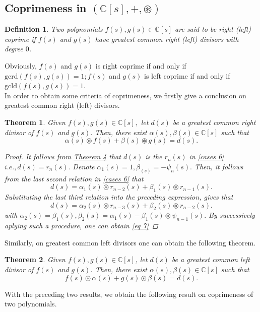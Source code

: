 \documentclass[12pt,a4paper,fleqn,twoside]{article}
\newtheorem{definition}{Definition}
\theoremstyle{plain}
\newtheorem{theorem}{Theorem}
\begin{document}
	\subsection{Coprimeness in $(\mathbb{C}[s],+,\circledast)$}
	\begin{definition}
		\normalfont
		Two polynomials $f(s),g(s)\in \mathbb{C}[s]$ are said to be right (left) coprime if $f(s)$ and $g(s)$ have greatest common right (left) divisors with degree $0$.
	\end{definition}
	Obviously, $f(s)$ and $g(s)$ is right coprime if and only if $\mathrm{gcrd}(f(s),g(s))=1; f(s)$ and $g(s)$ is left coprime if and only if $\mathrm{gcld}(f(s),g(s))=1$.\\
	\indent In order to obtain some criteria of coprimeness, we firstly give a conclusion on greatest common right (left) divisors.
	\begin{theorem}
		Given $f(s),g(s)\in \mathbb{C}[s],$ let $d(s)$ be a greatest common right divisor of $f(s)$ and $g(s).$ Then, there exist $\alpha(s),\beta(s)\in \mathbb{C}[s]$ such that
		\begin{equation}\label{eq 7}
			\alpha(s)\circledast f(s)+ \beta(s)\circledast g(s)=d(s).
		\end{equation}
		\begin{proof}
			It follows from \hyperref[theorem 4]{Theorem 4} that $d(s)$ is the $r_n(s)$ in \eqref{cases 6} $i.e.,d(s)=r_n(s).$ Denote $\alpha_1(s)=1,\beta_(s)=-\psi_n(s).$ Then, it follows from the last second relation in \eqref{cases 6} that
			\[d(s)=\alpha_1(s)\circledast r_{n-2}(s)+\beta_1(s)\circledast r_{n-1}(s).\]
			Substituting the last third relation into the preceding expression, gives that 
			\[d(s)=\alpha_2(s)\circledast r_{n-3}(s)+\beta_2(s)\circledast r_{n-2}(s).\]
			with $\alpha_2(s)=\beta_1(s),\beta_2(s)=\alpha_1(s)-\beta_1(s)\circledast \psi_{n-1}(s).$ By successively aplying such a procedure, one can obtain \eqref{eq 7}
		\end{proof}
	\end{theorem}
	Similarly, on greatest common left divisors one can obtain the following theorem.
	\begin{theorem}
		Given $f(s),g(s)\in \mathbb{C}[s]$, let $d(s)$ be a greatest common left divisor of $f(s)$ and $g(s)$. Then, there exist $\alpha(s),\beta(s)\in \mathbb{C}[s]$ such that
		\[f(s)\circledast \alpha(s)+g(s)\circledast \beta(s)=d(s).\]
	\end{theorem}
	With the preceding two results, we obtain the following result on coprimeness of two polynomials.
\end{document}
